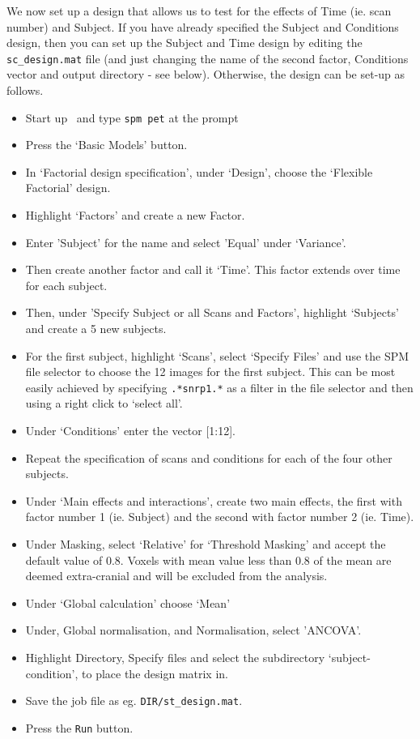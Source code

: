 We now set up a design that allows us to test for the effects of Time (ie. scan number) and Subject. If you have already specified the Subject and Conditions design, then you can set up the Subject and Time design by editing the \texttt{sc\_design.mat} file (and just changing the name of the second factor, Conditions vector and output directory - see below). Otherwise, the design can be set-up as follows.
\begin{itemize}
\item{Start up \matlab\ and type \texttt{spm pet} at the prompt}
\item{Press the `Basic Models' button.}
\item{In `Factorial design specification', under `Design', choose the `Flexible Factorial' design.}
\item{Highlight `Factors' and create a new Factor.}
\item{Enter 'Subject' for the name and select 'Equal' under `Variance'.}
\item{Then create another factor and call it `Time'. This factor extends over time for each subject.}
\item{Then, under 'Specify Subject or all Scans and Factors', highlight `Subjects' and create a 5 new subjects.}
\item{For the first subject, highlight `Scans', select `Specify Files' and use the SPM file selector to choose the 12 images for the first subject. This can be most easily achieved by specifying \texttt{.*snrp1.*} as a filter in the file selector and then using a right click to `select all'.}
\item{Under `Conditions' enter the vector [1:12].}
\item{Repeat the specification of scans and conditions for each of the four other subjects.}
\item{Under `Main effects and interactions', create two main effects, the first with factor number 1 (ie. Subject) and the second with factor number 2 (ie. Time).}
\item{Under Masking, select `Relative' for `Threshold Masking' and accept the default value of 0.8. Voxels with mean value less than 0.8 of the mean are deemed extra-cranial and will be excluded from the analysis.}
\item{Under `Global calculation' choose `Mean'}
\item{Under, Global normalisation, and Normalisation, select 'ANCOVA'.}
\item{Highlight Directory, Specify files and select the subdirectory `subject-condition', to place the design matrix in.}
\item{Save the job file as eg. \texttt{DIR/st\_design.mat}.}
\item{Press the \texttt{Run} button.}
\end{itemize}
